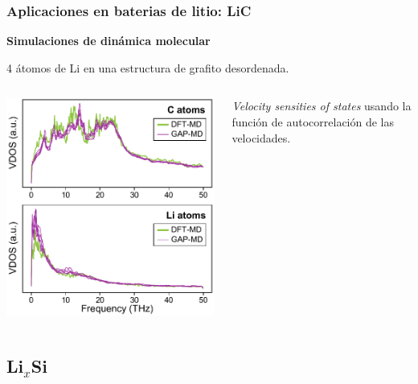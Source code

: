 \documentclass[aspectratio=169]{beamer}
\let\oldtextbf\textbf
\renewcommand{\textbf}[1]{\textcolor{nordblue}{\oldtextbf{#1}}}
\begin{document}
    \begin{frame}
        \frametitle{Aplicaciones en baterias de litio: LiC}

        \textbf{Simulaciones de dinámica molecular}

        4 átomos de Li en una estructura de grafito desordenada.
        
        \begin{columns}
            \begin{center}
                \includegraphics[width=\columnwidth]{LiC-VDOS.png}
            \end{center}
            
            \textit{Velocity sensities of states} usando la función de 
            autocorrelación de las velocidades.
        \end{columns}
    \end{frame}

    \subsection{Li$_x$Si}
    
\end{document}
